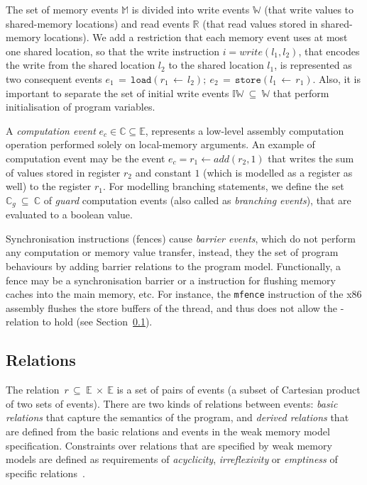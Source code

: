 The set of memory events $\mathbb{M}$ is divided into write events $\mathbb{W}$ (that write values to shared-memory locations) and read events $\mathbb{R}$ (that read values stored in shared-memory locations).
We add a restriction that each memory event uses at most one shared location, so that the write instruction $i = write(l_1, l_2)$, that encodes the write from the shared location $l_2$ to the shared location $l_1$, is represented as two consequent events $e_1\,=\,{\texttt{load}(r_1\,\leftarrow\,l_2)}; \ e_2\,=\,{\texttt{store}(l_1\,\leftarrow\,r_1)}$.
Also, it is important to separate the set of initial write events $\mathbb{IW}~\subseteq~\mathbb{W}$ that perform initialisation of program variables.

A \textit{computation event} $e_c \in \mathbb{C} \subseteq \mathbb{E}$, represents a low-level assembly computation operation performed solely on local-memory arguments.
An example of computation event may be the event $e_c = r_1 \leftarrow add(r_2, 1)$ that writes the sum of values stored in register $r_2$ and constant $1$ (which is modelled as a register as well) to the register $r_1$.
For modelling branching statements, we define the set $\mathbb{C}_{g}~\subseteq~\mathbb{C}$ of \textit{guard} computation events (also called as \textit{branching events}), that are evaluated to a boolean value.

Synchronisation instructions (fences) cause \textit{barrier events}, which do not perform any computation or memory value transfer, instead, they the set of program behaviours by adding barrier relations to the program model.
Functionally, a fence may be a synchronisation barrier or a instruction for flushing memory caches into the main memory, etc.
For instance, the \texttt{mfence} instruction of the x86 assembly flushes the store buffers of the thread, and thus does not allow the \rf-relation to hold (see Section~\ref{ch:wmm:model:relations}).


\subsection{Relations}
\label{ch:wmm:model:relations}


The relation~$r\,\subseteq~\mathbb{E}~\times~\mathbb{E}$ is a set of pairs of events (a subset of Cartesian product of two sets of events). There are two kinds of relations between events: \textit{basic relations} that capture the semantics of the program, and \textit{derived relations} that are defined from the basic relations and events in the weak memory model specification. Constraints over relations that are specified by weak memory models are defined as requirements of \textit{acyclicity}, \textit{irreflexivity} or \textit{emptiness} of specific relations~\cite{alglave2016syntax}.

